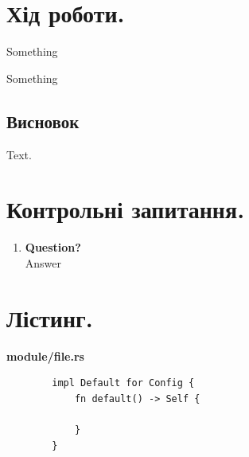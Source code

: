 \documentclass[14pt, a4paper]{extreport}
\begin{document}
	\section*{Хід роботи.}
	
	Something
	
	
	Something
	
	\subsection*{Висновок}
	
	Text. \\
	
	\section*{Контрольні запитання.}
	
	\begin{enumerate}
		\item \textbf{Question?} \\ Answer
	\end{enumerate}
	
	\pagebreak
	
	\section*{Лістинг.}
	
	\textbf{module/file.rs}
	
	\begin{verbatim} 
		impl Default for Config {
			fn default() -> Self {
			
			}
		}
	\end{verbatim}
	
\end{document}
